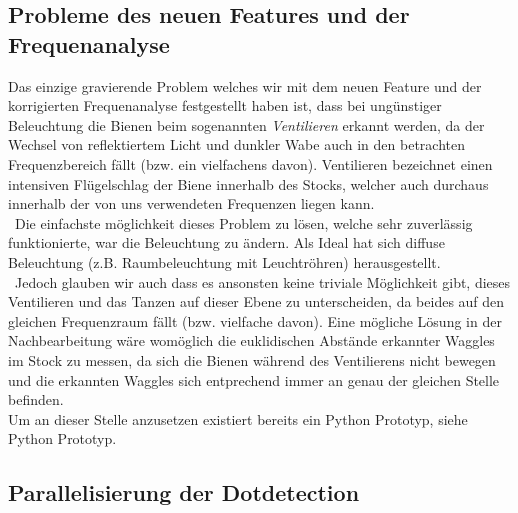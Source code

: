 \documentclass[11pt,a4paper]{article}
\begin{document}
\subsection{Probleme des neuen Features und der Frequenanalyse}
Das einzige gravierende Problem welches wir mit dem neuen Feature und der korrigierten Frequenanalyse festgestellt haben ist, dass bei ungünstiger Beleuchtung die Bienen beim sogenannten \textit{Ventilieren} erkannt werden, da der Wechsel von reflektiertem Licht und dunkler Wabe auch in den betrachten Frequenzbereich fällt (bzw. ein vielfachens davon). Ventilieren bezeichnet einen intensiven Flügelschlag der Biene innerhalb des Stocks, welcher auch durchaus innerhalb der von uns verwendeten Frequenzen liegen kann.\\\
Die einfachste möglichkeit dieses Problem zu lösen, welche sehr zuverlässig funktionierte, war die Beleuchtung zu ändern. Als Ideal hat sich diffuse Beleuchtung (z.B. Raumbeleuchtung mit Leuchtröhren) herausgestellt.\\\
Jedoch glauben wir auch dass es ansonsten keine triviale Möglichkeit gibt, dieses Ventilieren und das Tanzen auf dieser Ebene zu unterscheiden, da beides auf den gleichen Frequenzraum fällt (bzw. vielfache davon). Eine mögliche Lösung in der Nachbearbeitung wäre womöglich die euklidischen Abstände erkannter Waggles im Stock zu messen, da sich die Bienen während des Ventilierens nicht bewegen und die erkannten Waggles sich entprechend immer an genau der gleichen Stelle befinden.\\
Um an dieser Stelle anzusetzen existiert bereits ein Python Prototyp, siehe Python Prototyp.

\subsection{Parallelisierung der Dotdetection}
\end{document}
